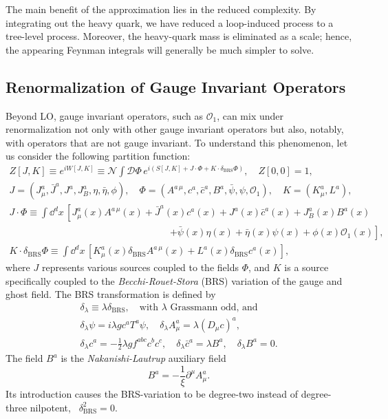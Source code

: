 The main benefit of the approximation lies in the reduced complexity. By integrating out the heavy quark, we have reduced a loop-induced process to a tree-level process. Moreover, the heavy-quark mass is eliminated as a scale; hence, the appearing Feynman integrals will generally be much simpler to solve.

\subsection{Renormalization of Gauge Invariant Operators}
Beyond \acs{LO}, gauge invariant operators, such as $\mathcal{O}_1$, can mix under renormalization not only with other gauge invariant operators but also, notably, with operators that are not gauge invariant. To understand this phenomenon, let us consider the following partition function:
\begin{equation}
\begin{gathered}
Z[J, K] \equiv e^{i W[J, K]} \equiv \mathcal{N} \int \mathcal{D} \Phi \, e^{i \left( S[J, K] + J \cdot \Phi + K \cdot \delta_{\text{BRS}} \Phi \right)}, \quad Z[0,0] = 1, \\
J = \left(J_\mu^a, \bar{J}^a, J^a, J_B^a, \eta, \bar{\eta}, \phi \right), \quad \Phi = \left(A^{a\, \mu}, c^a, \bar{c}^a, B^a, \bar{\psi}, \psi, \mathcal{O}_1 \right), \quad K = \left( K^a_\mu, L^a \right), \\
J \cdot \Phi \equiv \int \dd^d x\, \left[ J^{a}_\mu (x) A^{a\, \mu}(x) + \bar{J}^a(x) c^a(x) +  J^a(x)\bar{c}^a(x) + J_{B}^a(x) B^a(x) \right.  \\
\hspace{7cm} \left.+ \bar{\psi}(x) \eta(x) + \bar{\eta}(x) \psi(x) + \phi(x) \mathcal{O}_1(x) \right], \\
K \cdot \delta_{\text{BRS}} \Phi \equiv \int \dd^d x \, \left[ K^a_\mu(x) \delta_{\text{BRS}} A^{a\, \mu}(x) + L^a(x) \delta_{\text{BRS}} c^a(x) \right],
\end{gathered}
\end{equation}
where $J$ represents various sources coupled to the fields $\Phi$, and $K$ is a source specifically coupled to the \textit{Becchi-Rouet-Stora} (BRS) variation of the gauge and ghost field. The BRS transformation is defined by
\begin{equation}
\begin{gathered}
\delta_\lambda \equiv \lambda \delta_\text{BRS}, \quad \text{with } \lambda \text{ Grassmann odd, and} \\[6pt]
\delta_{\lambda} \psi = i \lambda g c^a T^a \psi, \quad \delta_\lambda A^a_\mu = \lambda (D_\mu c)^a,  \\[6pt]
\delta_\lambda c^a = - \frac{1}{2} \lambda g f^{abc} c^b c^c, \quad \delta_\lambda \bar{c}^a = \lambda B^a, \quad \delta_\lambda B^a = 0.
\end{gathered}
\end{equation}
The field $B^a$ is the \textit{Nakanishi-Lautrup} auxiliary field
\begin{equation}
B^a = -\frac{1}{\xi} \partial^\mu A^a_\mu.
\end{equation}
Its introduction causes the BRS-variation to be degree-two instead of degree-three nilpotent, \ie\ $\delta_{\text{BRS}}^2 = 0$.

